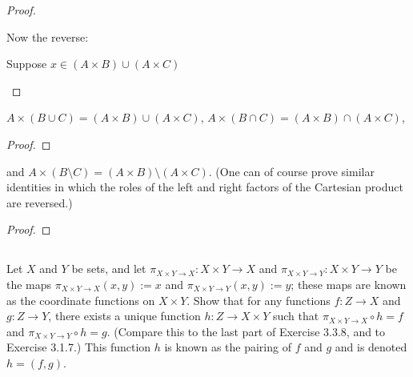 \documentclass[../../main.tex]{subfiles}
\begin{document}
\begin{q}
\begin{enumerate}
\begin{proof}
\begin{lxl}
\begin{lxl}
                \end{lxl}
            \end{lxl}
            \item Now the reverse:
            \begin{lxl}
                \item Suppose $x \in (A \times B) \cup (A \times C)$
                \begin{lxl}
                    \item
                \end{lxl}
            \end{lxl}
        \end{proof}
        \begin{xx}
            
        \end{xx}        
        \item $A \times (B \cup C) = (A \times B) \cup (A \times C)$, $A \times (B \cap C) = (A \times B) \cap (A \times C)$,
        \begin{proof}
    
        \end{proof}
        \begin{xx}
            
        \end{xx}        
        \item  and $A \times (B\setminus C) = (A \times B)\setminus(A \times C)$. (One can of course prove similar identities in which the roles of the left and right factors of the Cartesian product are reversed.)
        \begin{proof}
    
        \end{proof}
        \begin{xx}
            
        \end{xx}        
    \end{enumerate}    
\end{q}

\addtocounter{subsection}{2}
\subsection{}
\begin{q}
    Let $X$ and $Y$ be sets, and let $\pi_{X\times Y\to X} : X \times Y \to X$ and $\pi_{X\times Y\to Y} : X \times Y \to Y$ be the maps $\pi_{X\times Y\to X}(x, y) := x$ and $\pi_{X\times Y\to Y}(x, y) := y$; these maps are known as the coordinate functions on $X\times Y$. Show that for any functions $f : Z \to X$ and $g : Z \to Y$, there exists a unique function $h : Z \to X \times Y$ such that $\pi_{X\times Y\to X} \circ h = f$ and $\pi_{X\times Y\to Y} \circ h = g$. (Compare this to the last part of Exercise 3.3.8, and to Exercise 3.1.7.) This function $h$ is known as the pairing of $f$ and $g$ and is denoted $h = (f, g)$.
\end{q}
\end{document}
